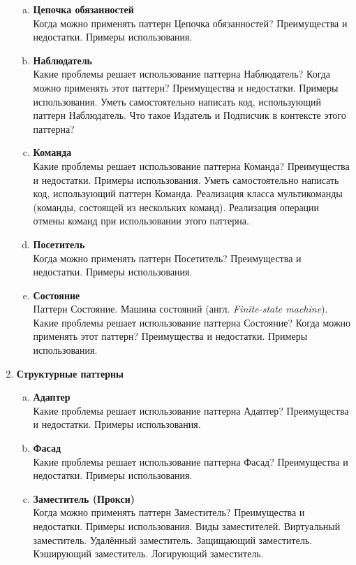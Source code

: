 \documentclass{article}
\begin{document}
\begin{enumerate}
\begin{enumerate}[a.]
\item \textbf{Цепочка обязанностей}\\
Когда можно применять паттерн Цепочка обязанностей? Преимущества и недостатки. Примеры использования.

\item \textbf{Наблюдатель}\\
Какие проблемы решает использование паттерна Наблюдатель? Когда можно применять этот паттерн? Преимущества и недостатки. Примеры использования. Уметь самостоятельно написать код, использующий паттерн Наблюдатель. Что такое Издатель и Подписчик в контексте этого паттерна?

\item \textbf{Команда}\\
Какие проблемы решает использование паттерна Команда? Преимущества и недостатки. Примеры использования. Уметь самостоятельно написать код, использующий паттерн Команда. Реализация класса мультикоманды (команды, состоящей из нескольких команд). Реализация операции отмены команд при использовании этого паттерна.


\item \textbf{Посетитель}\\
Когда можно применять паттерн Посетитель? Преимущества и недостатки. Примеры использования.

\item \textbf{Состояние}\\
Паттерн Состояние. Машина состояний (англ. \textit{Finite-state machine}). Какие проблемы решает использование паттерна Состояние? Когда можно применять этот паттерн? Преимущества и недостатки. Примеры использования. 

\end{enumerate}


\item \textbf{Структурные паттерны}
\begin{enumerate}[a.]
\item \textbf{Адаптер}\\
Какие проблемы решает использование паттерна Адаптер? Преимущества и недостатки. Примеры использования.

\item \textbf{Фасад}\\
Какие проблемы решает использование паттерна Фасад? Преимущества и недостатки. Примеры использования.

\item \textbf{Заместитель (Прокси)}\\
Когда можно применять паттерн Заместитель? Преимущества и недостатки. Примеры использования. Виды заместителей. Виртуальный заместитель. Удалённый заместитель. Защищающий заместитель. Кэширующий заместитель. Логирующий заместитель.


\end{enumerate}
\end{enumerate}
\end{document}
